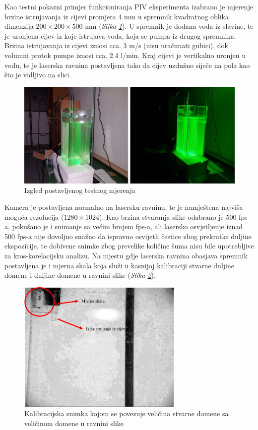 \par
Kao testni pokazni primjer funkcioniranja PIV eksperimenta izabrano je mjerenje brzine istrujavanja iz cijevi promjera 4 mm u spremnik kvadratnog oblika dimenzija $200\times200\times500$ mm (\textit{Slika \ref{sl:7.3}}). U spremnik je dodana voda iz slavine, te je uronjena cijev iz koje istrujava voda, koja se pumpa iz drugog spremnika. Brzina istrujavanja iz cijevi iznosi cca. 3 m/s (nisu uračunati gubici), dok volumni protok pumpe iznosi cca. 2.4 l/min. Kraj cijevi je vertikalno uronjen u vodu, te je laserska ravnina postavljena tako da cijev uzdužno siječe na pola kao što je vidljivo na slici.
\begin{figure}[h]  
	\centering
	\includegraphics[width=15cm]{./7_LowCostPIV/slika7_3.jpg} 
	\caption{Izgled postavljenog testnog mjerenja}
	\label{sl:7.3}
\end{figure}
\par
Kamera je postavljena normalno na lasersku ravninu, te je namještena najviša moguća rezolucija ($1280\times1024$). Kao brzina stvaranja slike odabrano je 500 fps-a, pokušano je i snimanje sa većim brojem fps-a, ali lasersko osvjetljenje iznad 500 fps-a nije dovoljno snažno da ispravno osvijetli čestice zbog prekratke duljine ekspozicije, te dobivene snimke zbog prevelike količine šuma nisu bile upotrebljive za kros-korelacijsku analizu. Na mjestu gdje laserska ravnina obasjava spremnik postavljena je i mjerna skala koja služi u kasnijoj kalibraciji stvarne duljine domene i duljine domene u ravnini slike (\textit{Slika \ref{sl:7.4}}).
 \begin{figure}[h]  
 	\centering
 	\includegraphics[width=8cm]{./7_LowCostPIV/slika7_4.jpg} 
 	\caption{Kalibracijska snimka kojom se povezuje veličina stvarne domene sa veličinom domene u ravnini slike}
 	\label{sl:7.4}
 \end{figure}
